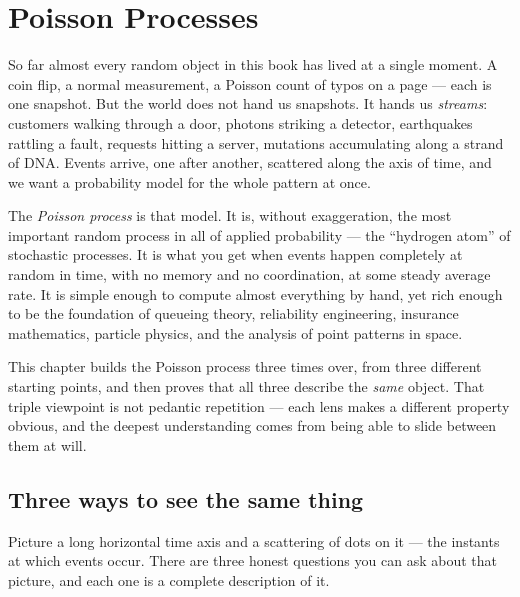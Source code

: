 \chapter{Poisson Processes}

So far almost every random object in this book has lived at a single moment.
A coin flip, a normal measurement, a Poisson count of typos on a page --- each
is one snapshot. But the world does not hand us snapshots. It hands us
\emph{streams}: customers walking through a door, photons striking a detector,
earthquakes rattling a fault, requests hitting a server, mutations accumulating
along a strand of DNA. Events arrive, one after another, scattered along the
axis of time, and we want a probability model for the whole pattern at once.

The \emph{Poisson process} is that model. It is, without exaggeration, the most
important random process in all of applied probability --- the ``hydrogen atom''
of stochastic processes. It is what you get when events happen completely at
random in time, with no memory and no coordination, at some steady average rate.
It is simple enough to compute almost everything by hand, yet rich enough to be
the foundation of queueing theory, reliability engineering, insurance
mathematics, particle physics, and the analysis of point patterns in space.

This chapter builds the Poisson process three times over, from three different
starting points, and then proves that all three describe the \emph{same} object.
That triple viewpoint is not pedantic repetition --- each lens makes a different
property obvious, and the deepest understanding comes from being able to slide
between them at will.

\section{Three ways to see the same thing}
\label{ch25:three-views}

Picture a long horizontal time axis and a scattering of dots on it --- the
instants at which events occur. There are three honest questions you can ask
about that picture, and each one is a complete description of it.

